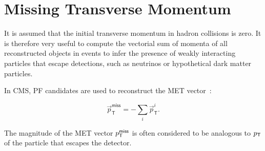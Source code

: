 \section{Missing Transverse Momentum}
\label{sec:MET}

It is assumed that the initial transverse momentum in hadron collisions is zero. It is therefore very useful to compute the vectorial sum of momenta of all reconstructed objects in events to infer the presence of weakly interacting particles that escape detections, such as neutrinos or hypothetical dark matter particles. 

In \ac{CMS}, \ac{PF} candidates are used to reconstruct the \ac{MET} vector~\cite{CMS:2019ctu}:

\begin{equation}
\overrightarrow{p}_{\textsf{T}}^{\textsf{miss}} = -\sum_{i} \overrightarrow{p}_{\textsf{T}}^{i}.
\end{equation}

The magnitude of the \ac{MET} vector $p_{\textsf{T}}^{\textsf{miss}}$ is often considered to be analogous to $p_{\textsf{T}}$ of the particle that escapes the detector. 